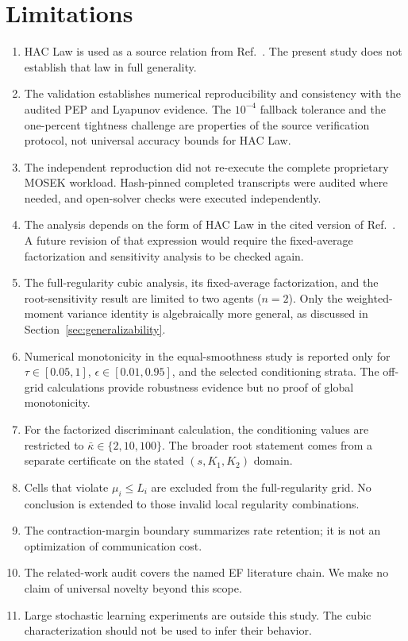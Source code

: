 \section{Limitations}

\begin{enumerate}
\item HAC Law is used as a source relation from Ref.~\cite{thomsen2026tight}. The present study does not establish that law in full generality.
\item The validation establishes numerical reproducibility and consistency with the audited PEP and Lyapunov evidence. The $10^{-4}$ fallback tolerance and the one-percent tightness challenge are properties of the source verification protocol, not universal accuracy bounds for HAC Law.
\item The independent reproduction did not re-execute the complete proprietary MOSEK workload. Hash-pinned completed transcripts were audited where needed, and open-solver checks were executed independently.
\item The analysis depends on the form of HAC Law in the cited version of Ref.~\cite{thomsen2026tight}. A future revision of that expression would require the fixed-average factorization and sensitivity analysis to be checked again.
\item The full-regularity cubic analysis, its fixed-average factorization, and the root-sensitivity result are limited to two agents ($n=2$). Only the weighted-moment variance identity is algebraically more general, as discussed in Section~\ref{sec:generalizability}.
\item Numerical monotonicity in the equal-smoothness study is reported only for $\tau\in [0.05,1]$, $\epsilon\in [0.01,0.95]$, and the selected conditioning strata. The off-grid calculations provide robustness evidence but no proof of global monotonicity.
\item For the factorized discriminant calculation, the conditioning values are restricted to $\bar{\kappa}\in \{2,10,100\}$. The broader root statement comes from a separate certificate on the stated $(s,K_1,K_2)$ domain.
\item Cells that violate $\mu_i\le L_i$ are excluded from the full-regularity grid. No conclusion is extended to those invalid local regularity combinations.
\item The contraction-margin boundary summarizes rate retention; it is not an optimization of communication cost.
\item The related-work audit covers the named EF literature chain. We make no claim of universal novelty beyond this scope.
\item Large stochastic learning experiments are outside this study. The cubic characterization should not be used to infer their behavior.
\end{enumerate}

